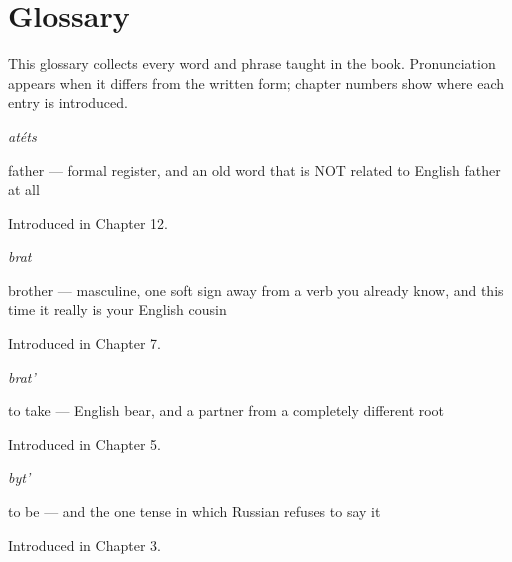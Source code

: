 
\chapter*{Glossary}

This glossary collects every word and phrase taught in the book. Pronunciation appears when it differs from the written form; chapter numbers show where each entry is introduced.

\noindent\begin{minipage}[t]{\linewidth}
\raggedright
\textbf{}\enspace\emph{atéts}\par
\small father — formal register, and an old word that is NOT related to English father at all\par
\footnotesize Introduced in Chapter 12.
\end{minipage}\par\medskip

\noindent\begin{minipage}[t]{\linewidth}
\raggedright
\textbf{}\enspace\emph{brat}\par
\small brother — masculine, one soft sign away from a verb you already know, and this time it really is your English cousin\par
\footnotesize Introduced in Chapter 7.
\end{minipage}\par\medskip

\noindent\begin{minipage}[t]{\linewidth}
\raggedright
\textbf{}\enspace\emph{brat'}\par
\small to take — English bear, and a partner from a completely different root\par
\footnotesize Introduced in Chapter 5.
\end{minipage}\par\medskip

\noindent\begin{minipage}[t]{\linewidth}
\raggedright
\textbf{}\enspace\emph{byt'}\par
\small to be — and the one tense in which Russian refuses to say it\par
\footnotesize Introduced in Chapter 3.
\end{minipage}\par\medskip

